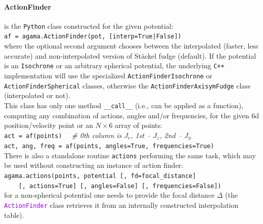 \documentclass[12pt]{article}
\newcommand{\Cpp}  {\texttt{C++}\xspace}
\newcommand{\Python}{\texttt{Python}\xspace}
\newcommand{\ttt}[1]{\textcolor{darkviolet}{\texttt{#1}}}
\newcommand{\ppp}[1]{\textcolor{darkolive} {\texttt{#1}}}
\let\oldparagraph\paragraph
\renewcommand{\paragraph}[1]{\vspace{-2mm}\oldparagraph{#1}}
\begin{document}
\paragraph{ActionFinder} is the \Python class constructed for the given potential:\\
\texttt{af = agama.ActionFinder(pot, [interp=True|False])}\\
where the optional second argument chooses between the interpolated (faster, less accurate) and non-interpolated version of St\"ackel fudge (default). If the potential is an \ppp{Isochrone} or an arbitrary spherical potential, the underlying \Cpp implementation will use the specialized \ppp{ActionFinderIsochrone} or \ppp{ActionFinderSpherical} classes, otherwise the \ppp{ActionFinder\-AxisymFudge} class (interpolated or not).\\
This class has only one method \texttt{__call__} (i.e., can be applied as a function), computing any combination of actions, angles and/or frequencies, for the given 6d position/velocity point or an $N\times6$ array of points:\\[1mm]
\texttt{act = af(points)}
\textit{\color{Sepia}\ \ \# 0th column is $J_r$, 1st -- $J_z$, 2nd -- $J_\phi$} \\
\texttt{act, ang, freq = af(points, angles=True, frequencies=True)}\\[2mm]
There is also a standalone routine \texttt{actions} performing the same task, which may be used without constructing an instance of action finder:\\[1mm]
\texttt{agama.actions(points, potential [, fd=focal_distance]}\\
\texttt{\mbox{}~~~~[, actions=True] [, angles=False] [, frequencies=False])}\\[1mm]
for a non-spherical potential one needs to provide the focal distance $\Delta$ (the \ttt{ActionFinder} class retrieves it from an internally constructed interpolation table).
\end{document}
